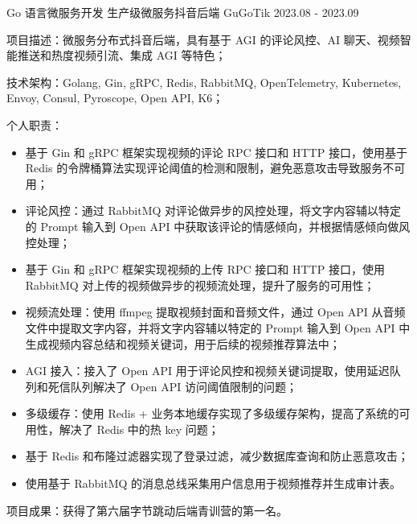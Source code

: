 

\begin{cventries}

  \cventry
    {Go 语言微服务开发} %
    {生产级微服务抖音后端 GuGoTik} %
    {2023.08 - 2023.09} %
    {} %
    {
      \begin{cvitems} %
        \item {项目描述：微服务分布式抖音后端，具有基于 AGI 的评论风控、AI 聊天、视频智能推送和热度视频引流、集成 AGI 等特色；}
        \item {技术架构：Golang, Gin, gRPC, Redis, RabbitMQ, OpenTelemetry, Kubernetes, Envoy, Consul, Pyroscope, Open API, K6；}
        \item {个人职责：}
          \begin{itemize}
            \item {基于 Gin 和 gRPC 框架实现视频的评论 RPC 接口和 HTTP 接口，使用基于 Redis 的令牌桶算法实现评论阈值的检测和限制，避免恶意攻击导致服务不可用；}
            \item {评论风控：通过 RabbitMQ 对评论做异步的风控处理，将文字内容辅以特定的 Prompt 输入到 Open API 中获取该评论的情感倾向，并根据情感倾向做风控处理；}
            \item {基于 Gin 和 gRPC 框架实现视频的上传 RPC 接口和 HTTP 接口，使用 RabbitMQ 对上传的视频做异步的视频流处理，提升了服务的可用性；}
            \item {视频流处理：使用 ffmpeg 提取视频封面和音频文件，通过 Open API 从音频文件中提取文字内容，并将文字内容辅以特定的 Prompt 输入到 Open API 中生成视频内容总结和视频关键词，用于后续的视频推荐算法中；}
            \item {AGI 接入：接入了 Open API 用于评论风控和视频关键词提取，使用延迟队列和死信队列解决了 Open API 访问阈值限制的问题；}
            \item {多级缓存：使用 Redis + 业务本地缓存实现了多级缓存架构，提高了系统的可用性，解决了 Redis 中的热 key 问题；}
            \item {基于 Redis 和布隆过滤器实现了登录过滤，减少数据库查询和防止恶意攻击；}
            \item {使用基于 RabbitMQ 的消息总线采集用户信息用于视频推荐并生成审计表。}
          \end{itemize}
        \item {项目成果：获得了第六届字节跳动后端青训营的第一名。}
      \end{cvitems}
    }


\end{cventries}

